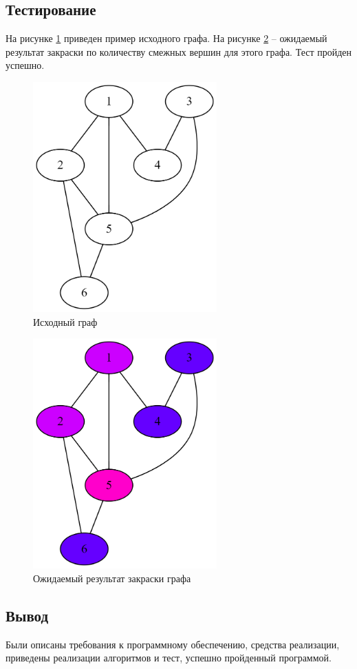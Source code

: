 \clearpage

\subsection{Тестирование}

На рисунке \ref{fig:test1_in} приведен пример исходного графа. На рисунке \ref{fig:test1_out} -- ожидаемый результат закраски по количеству смежных вершин для этого графа. Тест пройден успешно.

\begin{figure}[h!btp]
	\centering
	\includegraphics[width=200pt]{inc/test1_in.png}
	\caption{Исходный граф}
	\label{fig:test1_in}	
\end{figure}

\begin{figure}[h!btp]
	\centering
	\includegraphics[width=200pt]{inc/test1_out.png}
	\caption{Ожидаемый результат закраски графа}
	\label{fig:test1_out}	
\end{figure}

\subsection*{Вывод}

Были описаны требования к программному обеспечению, средства реализации, приведены реализации алгоритмов и тест, успешно пройденный программой.
